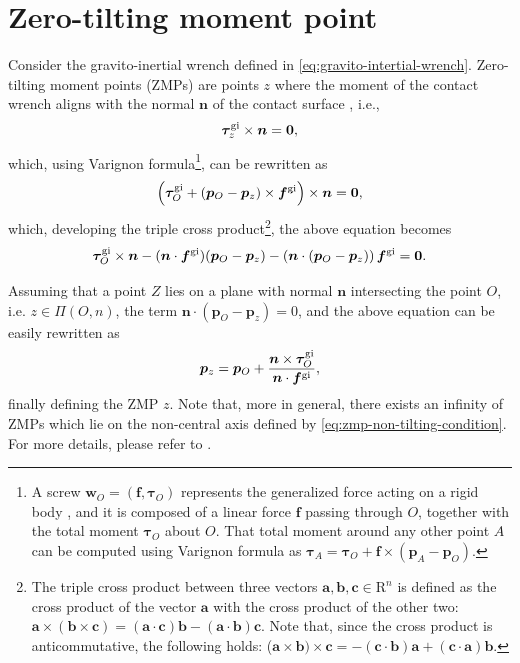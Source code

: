 \section{Zero-tilting moment point}
\label{sec:zero-tilting-moment-point}
Consider the gravito-inertial wrench defined in \ref{eq:gravito-intertial-wrench}. Zero-tilting moment points (ZMPs) are points $z$ where the moment of the contact wrench aligns with the normal $\bm{n}$ of the contact surface \cite{SardainBessonnet2004}, i.e.,
\begin{equation}
    \label{eq:zmp-non-tilting-condition}
    \bm{\tau}_z^{\rm gi} \times \bm{n} = \bm{0},
\end{equation}
which, using Varignon formula\footnote{A screw $\bm{w}_O =
(\bm{f},\bm{\tau}_O)$ represents the generalized force acting on a rigid body
\cite{Featherstone2007RigidBodyDynamicsAlgorithms},
and it is composed of a linear force $\bm{f}$ passing through $O$, together with the
total moment $\bm{\tau}_O$ about $O$. That total moment around any other point
$A$ can be computed using Varignon formula as $\bm{\tau}_A=\bm{\tau}_O+\bm{f}\times(\bm{p}_A-\bm{p}_O)$.}, can be rewritten as
\begin{equation*}
    \left(\bm{\tau}_O^{\rm gi} + (\bm{p}_O - \bm{p}_z) \times \bm{f}^{\rm gi}\right) \times \bm{n} = \bm{0},
\end{equation*}
which, developing the triple cross product\footnote{The triple cross product
between three vectors $\bm{a}, \bm{b}, \bm{c} \in \mathrm{R}^n$ is defined as
the cross product of the vector $\bm{a}$ with the cross product of the other
two: $\bm{a}\times(\bm{b}\times\bm{c})=(\bm{a}\cdot\bm{c})\bm{b}-
(\bm{a}\cdot\bm{b})\bm{c}$. Note that, since the cross product is anticommutative,
the following holds:
($\bm{a}\times\bm{b})\times\bm{c}=-(\bm{c}\cdot\bm{b})\bm{a}+
(\bm{c}\cdot\bm{a})\bm{b}$.}, the above equation becomes
\begin{equation}
    \bm{\tau}_O^{\rm gi} \times \bm{n} - (\bm{n} \cdot \bm{f}^{\rm gi}) (\bm{p}_O - \bm{p}_z) - \left(\bm{n} \cdot (\bm{p}_O - \bm{p}_z)\right) \bm{f}^{\rm gi} = \bm{0}.
\end{equation}

Assuming that a point $Z$ lies on a plane with normal $\bm{n}$ intersecting the point $O$, i.e. $z \in \Pi(O, n)$, the term $\bm{n} \cdot (\bm{p}_O - \bm{p}_z) = 0$, and the above equation can be easily rewritten as
\begin{equation}
    \bm{p}_z = \bm{p}_O + \frac{\bm{n} \times \bm{\tau}_O^{\rm gi}}{\bm{n} \cdot \bm{f}^{\rm gi}},
\end{equation}
finally defining the ZMP $z$. Note that, more in general, there exists an infinity of ZMPs which lie on the non-central axis defined by \eqref{eq:zmp-non-tilting-condition}. For more details, please refer to \cite{SardainBessonnet2004}.

